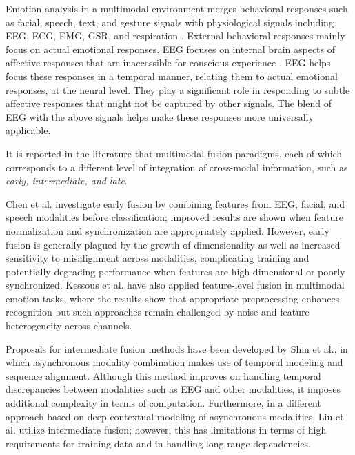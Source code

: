 \documentclass{WileyMSP-template}
\begin{document}
Emotion analysis in a multimodal environment merges behavioral responses such as facial, speech, text, and gesture signals with physiological signals including EEG, ECG, EMG, GSR, and respiration \cite{d2018physioaffect}. External behavioral responses mainly focus on actual emotional responses. EEG focuses on internal brain aspects of affective responses that are inaccessible for conscious experience \cite{ma2024peerjreview}. EEG helps focus these responses in a temporal manner, relating them to actual emotional responses, at the neural level. They play a significant role in responding to subtle affective responses that might not be captured by other signals. The blend of EEG with the above signals helps make these responses more universally applicable.

It is reported in the literature \cite{baltrusaitis2018multimodal} that multimodal fusion paradigms, each of which corresponds to a different level of integration of cross-modal information, such as \emph{early, intermediate, and late}.

Chen et al. \cite{chen2018featurefusion} investigate early fusion by combining features from EEG, facial, and speech modalities before classification; improved results are shown when feature normalization and synchronization are appropriately applied. However, early fusion is generally plagued by the growth of dimensionality as well as increased sensitivity to misalignment across modalities, complicating training and potentially degrading performance when features are high-dimensional or poorly synchronized. Kessous et al. \cite{kessous2017multimodal} have also applied feature-level fusion in multimodal emotion tasks, where the results show that appropriate preprocessing enhances recognition but such approaches remain challenged by noise and feature heterogeneity across channels.

Proposals for intermediate fusion methods have been developed by Shin et al., \cite{shin2017complex} in which asynchronous modality combination makes use of temporal modeling and sequence alignment. Although this method improves on handling temporal discrepancies between modalities such as EEG and other modalities, it imposes additional complexity in terms of computation. Furthermore, in a different approach based on deep contextual modeling of asynchronous modalities, Liu et al. \cite{liu2024multimodal} utilize intermediate fusion; however, this has limitations in terms of high requirements for training data and in handling long-range dependencies.
\end{document}
